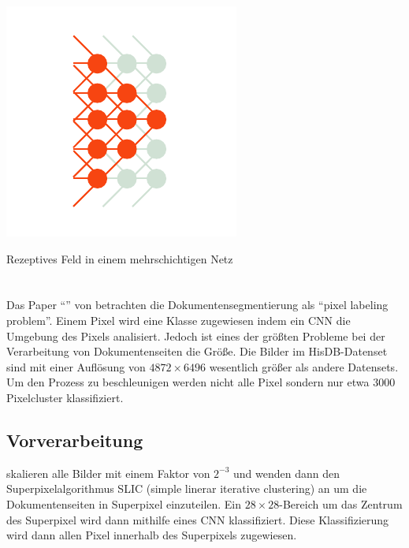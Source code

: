 \begin{marginfigure}
    \label{fig:cnn_neurons}
    \includegraphics[width=\textwidth]{figures/sketch/cnn/perceptive_field.pdf}
    \caption{Rezeptives Feld in einem mehrschichtigen Netz}
\end{marginfigure}

\qq{}

\section{\textcite{ChenConvolutionalNeuralNetworks2017}}
Das Paper ``'' von \citeauthor*{ChenConvolutionalNeuralNetworks2017} betrachten die Dokumentensegmentierung 
als ``pixel labeling problem''. Einem Pixel wird eine Klasse zugewiesen indem
ein CNN die Umgebung des Pixels analisiert. 
Jedoch ist eines der größten Probleme bei der Verarbeitung von Dokumentenseiten die Größe.
Die Bilder im HisDB-Datenset sind mit einer Auflösung von \(4872 \times 6496\) wesentlich größer als andere Datensets.
Um den Prozess zu beschleunigen werden nicht alle Pixel sondern nur etwa 3000 Pixelcluster klassifiziert. 

\subsection{Vorverarbeitung}
\citeauthor{ChenConvolutionalNeuralNetworks2017} skalieren alle Bilder mit einem Faktor von  \(2^{-3}\) und wenden dann den Superpixelalgorithmus SLIC (simple linerar iterative clustering) an \parencite{AchantaSLICSuperpixels2010} um die Dokumentenseiten in Superpixel einzuteilen.
Ein \(28 \times 28\)-Bereich um das Zentrum des Superpixel wird dann mithilfe eines CNN
klassifiziert. Diese Klassifizierung wird dann allen Pixel innerhalb des Superpixels zugewiesen.

